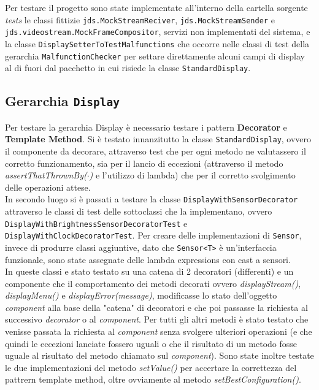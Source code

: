 \documentclass[a4paper,11pt]{article}
\begin{document}
	Per testare il progetto sono state implementate all'interno della cartella sorgente \textit{tests} le classi fittizie \texttt{jds.MockStreamReciver}, \texttt{jds.MockStreamSender} e \texttt{jds.videostream.MockFrameCompositor}, servizi non implementati del sistema, e la classe \texttt{DisplaySetterToTestMalfunctions} che occorre nelle classi di test della gerarchia \texttt{MalfunctionChecker} per settare direttamente alcuni campi di display al di fuori dal pacchetto in cui risiede la classe \texttt{StandardDisplay}.
	
	\subsection{Gerarchia \texttt{Display}}
	Per testare la gerarchia Display è necessario testare i pattern \textbf{Decorator} e \textbf{Template Method}.
	Si è testato innanzitutto la classe \texttt{StandardDisplay}, ovvero il componente da decorare, attraverso test che per ogni metodo ne valutassero il corretto funzionamento, sia per il lancio di eccezioni (attraverso il metodo \textit{assertThatThrownBy($\cdot$)} e l'utilizzo di lambda) che per il corretto svolgimento delle operazioni attese.\\
	In secondo luogo si è passati a testare la classe \texttt{DisplayWithSensorDecorator} attraverso le classi di test delle sottoclassi che la implementano, ovvero \texttt{DisplayWithBrightnessSensorDecoratorTest} e \texttt{DisplayWithClockDecoratorTest}.
	Per creare delle implementazioni di \texttt{Sensor}, invece di produrre classi aggiuntive, dato che \texttt{Sensor<T>} è un'interfaccia funzionale, sono state assegnate delle lambda expressions con cast a sensori.\\
	In queste classi e stato testato su una catena di 2 decoratori (differenti) e un componente che il comportamento dei metodi decorati ovvero \textit{displayStream()}, \textit{displayMenu()} e \textit{displayError(message)}, modificasse lo stato dell'oggetto \textit{component} alla base della "catena" di decoratori e che poi passasse la richiesta al successivo \textit{decorator} o al \textit{component}. Per tutti gli altri metodi è stato testato che venisse passata la richiesta al \textit{component} senza svolgere ulteriori operazioni (e che quindi le eccezioni lanciate fossero uguali o che il risultato di un metodo fosse uguale al risultato del metodo chiamato sul \textit{component}).
	Sono state inoltre testate le due implementazioni del metodo \textit{setValue()} per accertare la correttezza del pattrern template method, oltre ovviamente al metodo \textit{setBestConfiguration()}.
	
\end{document}

